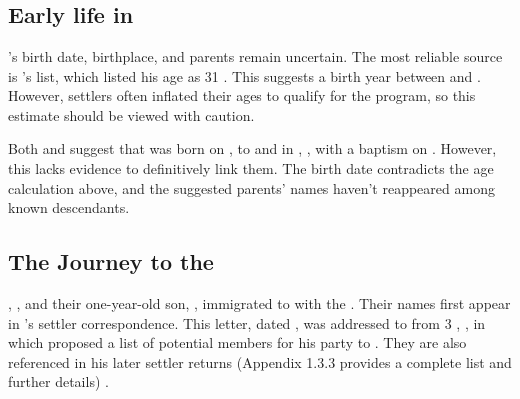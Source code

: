 \chapter[James McDonald]{\mcdonaldJName{}}
\label{ch1: James McDonald}

\section[Early life in Britain]{Early life in \britain{}}


\mcdonaldJNameOnly{}'s birth date, birthplace, and parents remain uncertain. The most reliable source is \biggarASurname{}'s \settler{} list, which listed his age as 31 \autocite[536-539]{eggsa:biggarCorrespondance}. This suggests a birth year between  and . However, settlers often inflated their ages to qualify for the program, so this estimate should be viewed with caution.

Both \citeauthor{FS:JamesMcDonaldBaptism} and \citeauthor{settlers:JamesMcDonald} suggest that \mcdonaldJName{} was born on , to \mcdonaldWWFullNames{} and \aitchisonJFullNames{} in \crawfordFull{}, \scotland{}, with a baptism on  \autocite{FS:JamesMcDonaldBaptism} \autocite{settlers:JamesMcDonald}. However, this lacks evidence to definitively link them. The birth date contradicts the age calculation above, and the suggested parents' names haven't reappeared among known descendants.

\section[The Journey to the Cape Colony]{The Journey to the \capeColony}
\label{ch1: Journey to the Cape Colony}

\mcdonaldJNameOnly{}, \welchMNameOnly{}, and their one-year-old son, \mcdonaldANameOnly{}, immigrated to \southAfrica{} with the \settlersBritish{} \autocite[46]{nash:1820}. Their names first appear in \biggarAName{}'s settler correspondence. This letter, dated , was addressed to \bathurstHName{} from 3 \northumberlandCourtFull{}, \london{}, in which \biggarASurname{} proposed a list of potential members for his party to \southAfrica \autocite[536-539]{eggsa:biggarCorrespondance}. They are also referenced in his later settler returns (Appendix 1.3.3 provides a complete list and further details) \autocite{eggsa:biggarReturn}.

